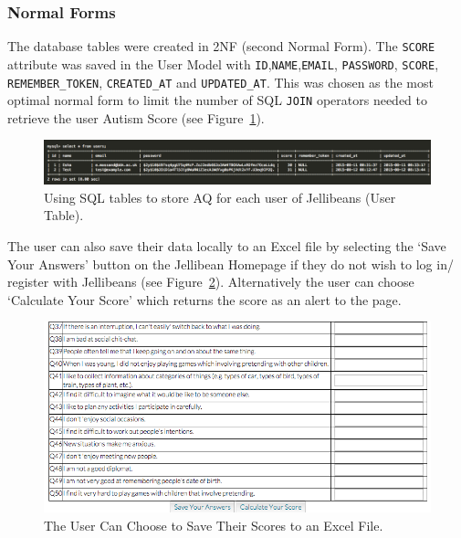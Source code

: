 \documentclass[a4paper, 11pt]{article}
\begin{document}
\subsubsection{Normal Forms}
The database tables were created in 2NF (second Normal Form). The \texttt{SCORE} attribute was saved in the User Model with \texttt{ID},\texttt{NAME},\texttt{EMAIL}, \texttt{PASSWORD}, \texttt{SCORE}, \texttt{REMEMBER\_TOKEN}, \texttt{CREATED\_AT} and \texttt{UPDATED\_AT}. This was chosen as the most optimal normal form to limit the number of SQL \texttt{JOIN} operators needed to retrieve the user Autism Score (see Figure~\ref{usertable1}). 
\begin{figure}[H]
\begin{center}
\includegraphics[scale=0.40]{usertable1}
\caption{Using SQL tables to store AQ for each user of Jellibeans (User Table).}
\label{usertable1}
\end{center}
\end{figure}

The user can also save their data locally to an Excel file by selecting the `Save Your Answers' button on the Jellibean Homepage if they do not wish to log in/ register with Jellibeans (see Figure~\ref{saveScores}). Alternatively the user can choose `Calculate Your Score' which returns the score as an alert to the page.


\begin{figure}[H]
\begin{center}
\includegraphics[scale=0.5]{saveScores}
\caption{The User Can Choose to Save Their Scores to an Excel File.}
\label{saveScores}
\end{center}
\end{figure}
\end{document}
